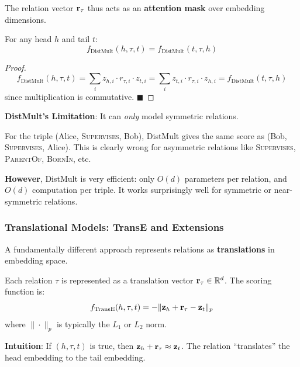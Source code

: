 \begin{notechapter}
\begin{mathbox}
The relation vector $\mathbf{r}_\tau$ thus acts as an \textbf{attention mask} over embedding dimensions.
\end{mathbox}

\begin{proposition}
For any head $h$ and tail $t$:
\[
f_{\text{DistMult}}(h, \tau, t) = f_{\text{DistMult}}(t, \tau, h)
\]
\end{proposition}

\begin{proof}
\[
f_{\text{DistMult}}(h, \tau, t) = \sum_i z_{h,i} \cdot r_{\tau,i} \cdot z_{t,i} = \sum_i z_{t,i} \cdot r_{\tau,i} \cdot z_{h,i} = f_{\text{DistMult}}(t, \tau, h)
\]
since multiplication is commutative. $\blacksquare$
\end{proof}

\begin{keyinsight}
\textbf{DistMult's Limitation}: It can \emph{only} model symmetric relations.

For the triple (Alice, \textsc{Supervises}, Bob), DistMult gives the same score as (Bob, \textsc{Supervises}, Alice). This is clearly wrong for asymmetric relations like \textsc{Supervises}, \textsc{ParentOf}, \textsc{BornIn}, etc.

\textbf{However}, DistMult is very efficient: only $O(d)$ parameters per relation, and $O(d)$ computation per triple. It works surprisingly well for symmetric or near-symmetric relations.
\end{keyinsight}


\subsubsection{Translational Models: TransE and Extensions}

A fundamentally different approach represents relations as \textbf{translations} in embedding space.

\begin{definition}
Each relation $\tau$ is represented as a translation vector $\mathbf{r}_\tau \in \mathbb{R}^d$. The scoring function is:
\begin{equation}
f_{\text{TransE}}(h, \tau, t) = -\|\mathbf{z}_h + \mathbf{r}_\tau - \mathbf{z}_t\|_p
\end{equation}
where $\|\cdot\|_p$ is typically the $L_1$ or $L_2$ norm.

\textbf{Intuition}: If $(h, \tau, t)$ is true, then $\mathbf{z}_h + \mathbf{r}_\tau \approx \mathbf{z}_t$. The relation ``translates'' the head embedding to the tail embedding.
\end{definition}


\end{notechapter}
